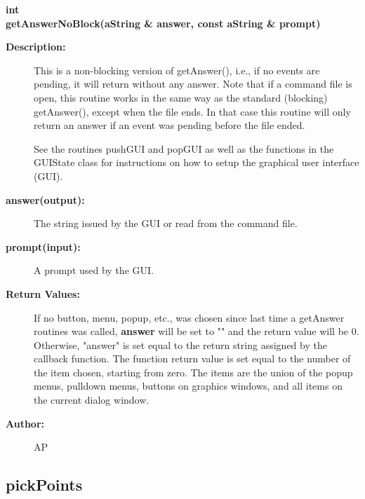 \begin{flushleft} \textbf{%
int  \\ 
\settowidth{\GLGraphicsInterfaceIncludeArgIndent}{getAnswerNoBlock(}%
getAnswerNoBlock(aString \& answer, const aString \& prompt)
}\end{flushleft}
\begin{description}
\item[{\bf Description:}] 
  This is a non-blocking version of getAnswer(), i.e., if no events are pending, it will return
  without any answer. Note that if a command file is open, this routine works in the same way
  as the standard (blocking) getAnswer(), except when the file ends. In that case this routine
  will only return an answer if an event was pending before the file ended.

  See the routines pushGUI and popGUI as well as the functions in the GUIState class
  for instructions on how to setup the graphical user interface (GUI).

\item[{\bf answer(output):}]  The string issued by the GUI or read from the command file.
\item[{\bf prompt(input):}]  A prompt used by the GUI.
\item[{\bf Return Values:}]  If no button, menu, popup, etc., was chosen
  since last time a getAnswer routines was called, {\bf answer} will be set to "" and the 
  return value will be 0. Otherwise, "answer" is set equal to the 
  return string assigned by the callback function. The function return value is set equal to
    the number of the item chosen, starting from zero. The items are the union of the
    popup menus, pulldown menus, buttons on graphics windows, and all items on the 
    current dialog window.

\item[{\bf Author:}]  AP
\end{description}
\subsection{pickPoints}
 
